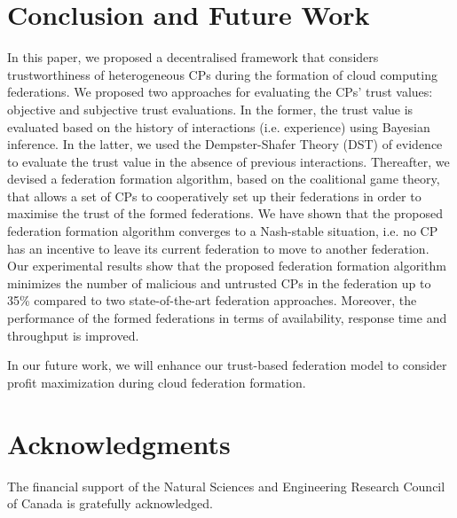 \documentclass[preprint]{elsarticle}
\theoremstyle{definition}
\theoremstyle{remark}
\theoremstyle{property}
\begin{document}

\section{Conclusion and Future Work}

In this paper, we proposed a decentralised framework that considers trustworthiness of heterogeneous CPs during
the formation of cloud computing federations. We proposed two approaches for evaluating the CPs' trust values: objective and subjective trust evaluations. In the former, the trust value is evaluated based on the history of interactions (i.e. experience) using Bayesian inference. In the latter, we used the Dempster-Shafer Theory (DST) of evidence to evaluate the trust value in the absence of previous interactions. Thereafter, we devised a federation formation algorithm, based on the coalitional game theory, that allows a set of CPs to cooperatively set up their federations in order to maximise the trust of the formed federations. We have shown that the proposed federation formation algorithm converges to a Nash-stable situation, i.e. no CP has an incentive to leave its current federation to move to another federation. Our experimental results show that the proposed federation formation algorithm minimizes the number of malicious and untrusted CPs in the federation up to 35\% compared to two state-of-the-art federation approaches. Moreover,
the performance of the formed federations in terms of availability, response time and throughput is improved.

In our future work, we will enhance our trust-based federation model to consider profit maximization during cloud federation formation.


\section*{Acknowledgments}
The financial support of the Natural Sciences and Engineering Research Council of Canada is gratefully acknowledged.



\vspace{10 mm}
\end{document}
